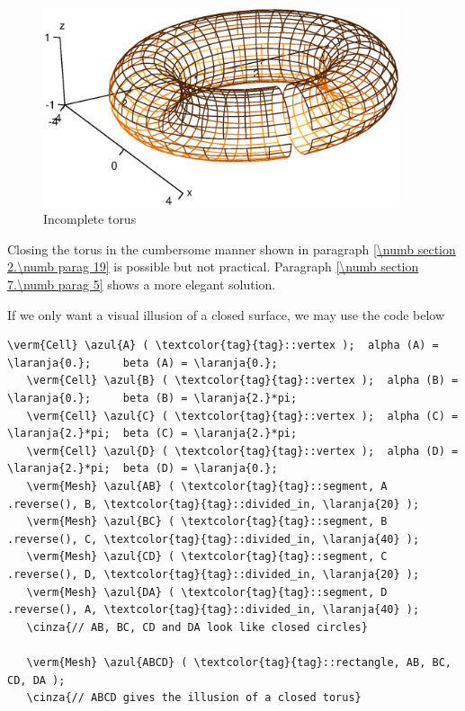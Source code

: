 \begin{figure}[ht] \centering
  \includegraphics[width=105mm]{torus}
  \caption{Incomplete torus}
  \label{\numb section 2.\numb fig 21}
\end{figure}

Closing the torus in the cumbersome manner shown in paragraph
\ref{\numb section 2.\numb parag 19} is possible but not practical.
Paragraph \ref{\numb section 7.\numb parag 5} shows a more elegant solution.

If we only want a visual illusion of a closed surface, we may use the code below

\begin{Verbatim}[commandchars=\\\{\},formatcom=\small\tt,baselinestretch=0.94]
   \verm{Cell} \azul{A} ( \textcolor{tag}{tag}::vertex );  alpha (A) = \laranja{0.};     beta (A) = \laranja{0.};
   \verm{Cell} \azul{B} ( \textcolor{tag}{tag}::vertex );  alpha (B) = \laranja{0.};     beta (B) = \laranja{2.}*pi;
   \verm{Cell} \azul{C} ( \textcolor{tag}{tag}::vertex );  alpha (C) = \laranja{2.}*pi;  beta (C) = \laranja{2.}*pi;
   \verm{Cell} \azul{D} ( \textcolor{tag}{tag}::vertex );  alpha (D) = \laranja{2.}*pi;  beta (D) = \laranja{0.};
   \verm{Mesh} \azul{AB} ( \textcolor{tag}{tag}::segment, A .reverse(), B, \textcolor{tag}{tag}::divided_in, \laranja{20} );
   \verm{Mesh} \azul{BC} ( \textcolor{tag}{tag}::segment, B .reverse(), C, \textcolor{tag}{tag}::divided_in, \laranja{40} );
   \verm{Mesh} \azul{CD} ( \textcolor{tag}{tag}::segment, C .reverse(), D, \textcolor{tag}{tag}::divided_in, \laranja{20} );
   \verm{Mesh} \azul{DA} ( \textcolor{tag}{tag}::segment, D .reverse(), A, \textcolor{tag}{tag}::divided_in, \laranja{40} );
   \cinza{// AB, BC, CD and DA look like closed circles}

   \verm{Mesh} \azul{ABCD} ( \textcolor{tag}{tag}::rectangle, AB, BC, CD, DA );
   \cinza{// ABCD gives the illusion of a closed torus}
\end{Verbatim}


